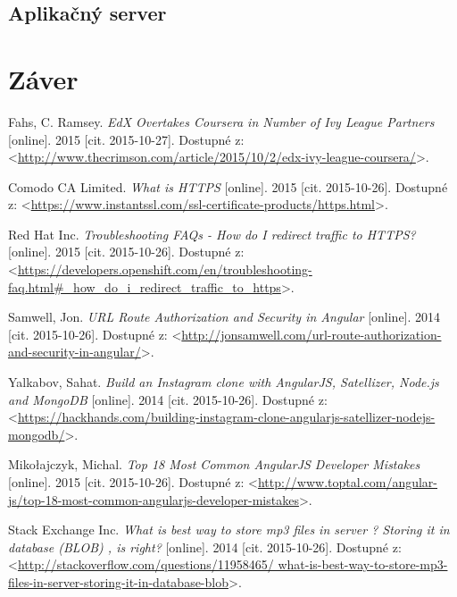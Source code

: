 \documentclass[12pt,oneside]{fithesis2}
\begin{document}
      \section{Aplikačný server}
    \chapter{Záver}   
       
    \begin{thebibliography}{59}
    
  		Fahs, C. Ramsey.
  		\emph{EdX Overtakes Coursera in Number of Ivy League Partners}
  		[online].
  		2015
  		[cit. 2015-10-27].
  		Dostupné z: <\url{http://www.thecrimson.com/article/2015/10/2/edx-ivy-league-coursera/}>.

  		Comodo CA Limited.
  		\emph{What is HTTPS}
  		[online].
  		2015
  		[cit. 2015-10-26].
  		Dostupné z: <\url{https://www.instantssl.com/ssl-certificate-products/https.html}>.
	
  		Red Hat Inc.
  		\emph{Troubleshooting FAQs - How do I redirect traffic to HTTPS?}
  		[online].
  		2015
  		[cit. 2015-10-26].
  		Dostupné z: <\url{https://developers.openshift.com/en/troubleshooting-faq.html#_how_do_i_redirect_traffic_to_https}>.
  		
  		Samwell, Jon.
  		\emph{URL Route Authorization and Security in Angular}
  		[online].
  		2014
  		[cit. 2015-10-26].
  		Dostupné z: <\url{http://jonsamwell.com/url-route-authorization-and-security-in-angular/}>.
  		
  		Yalkabov, Sahat.
  		\emph{Build an Instagram clone with AngularJS, Satellizer, Node.js and MongoDB}
  		[online].
  		2014
  		[cit. 2015-10-26].
  		Dostupné z: <\url{https://hackhands.com/building-instagram-clone-angularjs-satellizer-nodejs-mongodb/}>.
  		
  		Mikołajczyk, Michal.
  		\emph{Top 18 Most Common AngularJS Developer Mistakes}
  		[online].
  		2015
  		[cit. 2015-10-26].
  		Dostupné z: <\url{http://www.toptal.com/angular-js/top-18-most-common-angularjs-developer-mistakes}>.
  			
  		Stack Exchange Inc.
  		\emph{What is best way to store mp3 files in server ? Storing it in database (BLOB) , is right?}
  		[online].
  		2014
  		[cit. 2015-10-26].
  		Dostupné z: <\url{http://stackoverflow.com/questions/11958465/
  		what-is-best-way-to-store-mp3-files-in-server-storing-it-in-database-blob}>.
  		

\end{thebibliography}
\end{document}
